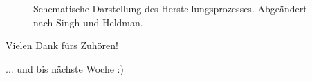 \documentclass[aspectratio=169,9pt]{beamer}
\newcommand{\antwort}[1]{
\begin{tcolorbox}[
	enhanced,
	colframe=unigrau!65,
	sharp corners,
	boxsep=1pt,
	colback=white,
	coltitle=black,
]
	#1
	\end{tcolorbox}
}
\begin{document}
\begin{frame}
\begin{minipage}{.5\textwidth}
\begin{figure}
\caption{Schematische Darstellung des Herstellungsprozesses. Abgeändert nach Singh und Heldman.}
\label{masse}
\end{figure}
\end{minipage}%


\end{frame}







\begin{frame}
\begin{center}
\large Vielen Dank fürs Zuhören!
\par \normalsize ... und bis nächste Woche :)
\end{center}


\end{frame}
\end{document}
